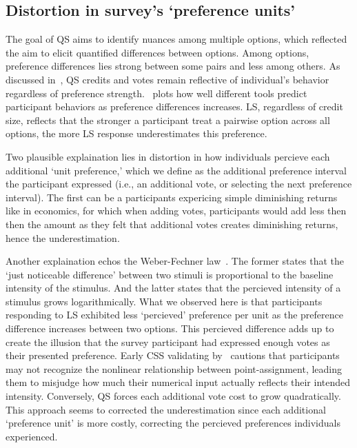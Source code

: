 \subsection{Distortion in survey's `preference units'}
The goal of QS aims to identify nuances among multiple options, which reflected the aim to elicit quantified differences between options. Among options, preference differences lies strong between some pairs and less among others. As discussed in~, QS credits and votes remain reflective of individual's behavior regardless of preference strength.~ plots how well different tools predict participant behaviors as preference differences increases. LS, regardless of credit size, reflects that the stronger a participant treat a pairwise option across all options, the more LS response underestimates this preference.

Two plausible explaination lies in distortion in how individuals percieve each additional `unit preference,' which we define as the additional preference interval the participant expressed (i.e., an additional vote, or selecting the next preference interval). The first can be a participants expericing simple diminishing returns~\cite{mankiwPrinciplesEconomics2018} like in economics, for which when adding votes, participants would add less then then the amount as they felt that additional votes creates diminishing returns, hence the underestimation. 

Another explaination echos the Weber-Fechner law~\cite{}. The former states that the `just noticeable difference' between two stimuli is proportional to the baseline intensity of the stimulus. And the latter states that the percieved intensity of a stimulus grows logarithmically. What we observed here is that participants responding to LS exhibited less `percieved' preference per unit as the preference difference increases between two options. This percieved difference adds up to create the illusion that the survey participant had expressed enough votes as their presented preference. Early CSS validating by~\citet{dudekValidityPointAssignmentProcedure1957} cautions that participants may not recognize the nonlinear relationship between point-assignment, leading them to misjudge how much their numerical input actually reflects their intended intensity. Conversely, QS forces each additional vote cost to grow quadratically. This approach seems to corrected the underestimation since each additional `preference unit' is more costly, correcting the percieved preferences individuals experienced.

